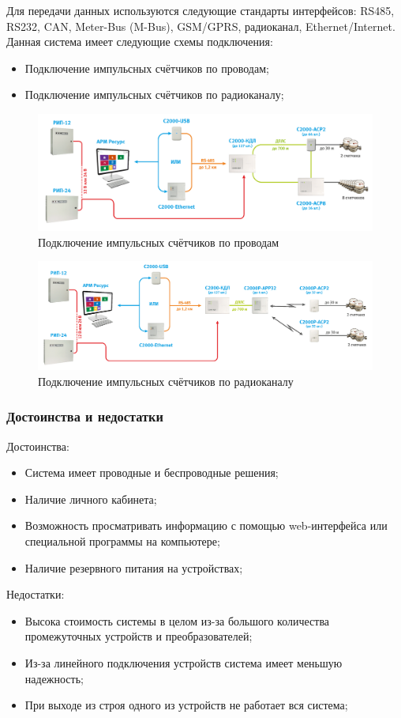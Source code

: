 Для передачи данных используются следующие стандарты интерфейсов: RS485, RS232, CAN, Meter-Bus (M-Bus), GSM/GPRS, радиоканал, Ethernet/Internet.
Данная система имеет следующие схемы подключения:
\begin{itemize}
	\item Подключение импульсных счётчиков по проводам;
	\item Подключение импульсных счётчиков по радиоканалу;
\end{itemize}

\begin{figure}[H]
	\centering
	\includegraphics[width=0.7\linewidth]{pics/impuls}
	\caption{Подключение импульсных счётчиков по проводам}
	\label{fig:impuls}
\end{figure}

\begin{figure}[H]
	\centering
	\includegraphics[width=0.7\linewidth]{pics/radio}
	\caption{Подключение импульсных счётчиков по радиоканалу}
	\label{fig:radio}
\end{figure}

\subsubsection{Достоинства и недостатки}

Достоинства:
\begin{itemize}
	\item Система имеет проводные и беспроводные решения;
	\item Наличие личного кабинета; 
	\item Возможность просматривать информацию с помощью web-интерфейса или специальной программы на компьютере;
	\item Наличие резервного питания на устройствах;
\end{itemize}
Недостатки:
\begin{itemize}
	\item Высока стоимость системы в целом из-за большого количества промежуточных устройств и преобразователей;
	\item Из-за линейного подключения устройств система имеет меньшую надежность; \item При выходе из строя одного из устройств не работает вся система;
\end{itemize}

